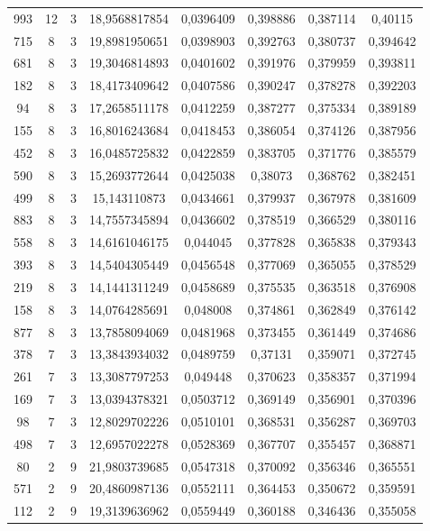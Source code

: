 \begin{longtable}{|c|c|c|c|c|c|c|c|}
993 & 12 & 3 & 18,9568817854 & 0,0396409 & 0,398886 & 0,387114 & 0,40115 \\
715 & 8 & 3 & 19,8981950651 & 0,0398903 & 0,392763 & 0,380737 & 0,394642 \\
681 & 8 & 3 & 19,3046814893 & 0,0401602 & 0,391976 & 0,379959 & 0,393811 \\
182 & 8 & 3 & 18,4173409642 & 0,0407586 & 0,390247 & 0,378278 & 0,392203 \\
94 & 8 & 3 & 17,2658511178 & 0,0412259 & 0,387277 & 0,375334 & 0,389189 \\
155 & 8 & 3 & 16,8016243684 & 0,0418453 & 0,386054 & 0,374126 & 0,387956 \\
452 & 8 & 3 & 16,0485725832 & 0,0422859 & 0,383705 & 0,371776 & 0,385579 \\
590 & 8 & 3 & 15,2693772644 & 0,0425038 & 0,38073 & 0,368762 & 0,382451 \\
499 & 8 & 3 & 15,143110873 & 0,0434661 & 0,379937 & 0,367978 & 0,381609 \\
883 & 8 & 3 & 14,7557345894 & 0,0436602 & 0,378519 & 0,366529 & 0,380116 \\
558 & 8 & 3 & 14,6161046175 & 0,044045 & 0,377828 & 0,365838 & 0,379343 \\
393 & 8 & 3 & 14,5404305449 & 0,0456548 & 0,377069 & 0,365055 & 0,378529 \\
219 & 8 & 3 & 14,1441311249 & 0,0458689 & 0,375535 & 0,363518 & 0,376908 \\
158 & 8 & 3 & 14,0764285691 & 0,048008 & 0,374861 & 0,362849 & 0,376142 \\
877 & 8 & 3 & 13,7858094069 & 0,0481968 & 0,373455 & 0,361449 & 0,374686 \\
378 & 7 & 3 & 13,3843934032 & 0,0489759 & 0,37131 & 0,359071 & 0,372745 \\
261 & 7 & 3 & 13,3087797253 & 0,049448 & 0,370623 & 0,358357 & 0,371994 \\
169 & 7 & 3 & 13,0394378321 & 0,0503712 & 0,369149 & 0,356901 & 0,370396 \\
98 & 7 & 3 & 12,8029702226 & 0,0510101 & 0,368531 & 0,356287 & 0,369703 \\
498 & 7 & 3 & 12,6957022278 & 0,0528369 & 0,367707 & 0,355457 & 0,368871 \\
80 & 2 & 9 & 21,9803739685 & 0,0547318 & 0,370092 & 0,356346 & 0,365551 \\
571 & 2 & 9 & 20,4860987136 & 0,0552111 & 0,364453 & 0,350672 & 0,359591 \\
112 & 2 & 9 & 19,3139636962 & 0,0559449 & 0,360188 & 0,346436 & 0,355058 \\

\end{longtable}
